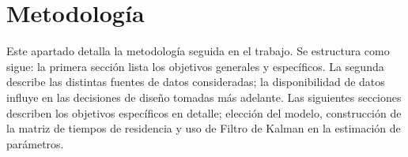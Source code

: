 \chapter{Metodología}

Este apartado detalla la metodología seguida en el trabajo. Se estructura como sigue: la primera sección lista los objetivos generales y específicos. La segunda describe las distintas fuentes de datos consideradas; la disponibilidad de datos influye en las decisiones de diseño tomadas más adelante. Las siguientes secciones describen los objetivos específicos en detalle; elección del modelo, construcción de la matriz de tiempos de residencia y uso de Filtro de Kalman en la estimación de parámetros.


    
    
    
